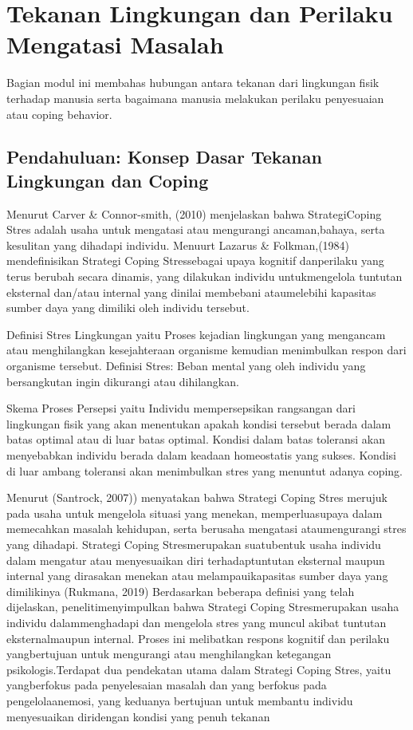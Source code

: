 \documentclass[../manperil.tex]{subfiles}
\begin{document}
\section{Tekanan Lingkungan dan Perilaku Mengatasi Masalah}

Bagian modul ini membahas hubungan antara tekanan dari lingkungan fisik terhadap manusia serta bagaimana manusia melakukan perilaku penyesuaian atau coping behavior.

\subsection{Pendahuluan: Konsep Dasar Tekanan Lingkungan dan Coping}


Menurut Carver \& Connor-smith, (2010) menjelaskan bahwa StrategiCoping Stres adalah usaha untuk mengatasi atau mengurangi ancaman,bahaya, serta kesulitan yang dihadapi individu. Menuurt Lazarus \& Folkman,(1984) mendefinisikan Strategi Coping Stressebagai upaya kognitif danperilaku yang terus berubah secara dinamis, yang dilakukan individu untukmengelola tuntutan eksternal dan/atau internal yang dinilai membebani ataumelebihi kapasitas sumber daya yang dimiliki oleh individu tersebut.


Definisi Stres Lingkungan yaitu Proses kejadian lingkungan yang mengancam atau menghilangkan kesejahteraan organisme kemudian menimbulkan respon dari organisme tersebut. Definisi Stres: Beban mental yang oleh individu yang bersangkutan ingin dikurangi atau dihilangkan.

Skema Proses Persepsi yaitu Individu mempersepsikan rangsangan dari lingkungan fisik yang akan menentukan apakah kondisi tersebut berada dalam batas optimal atau di luar batas optimal. Kondisi dalam batas toleransi akan menyebabkan individu berada dalam keadaan homeostatis yang sukses. Kondisi di luar ambang toleransi akan menimbulkan stres yang menuntut adanya coping.

Menurut (Santrock, 2007)) menyatakan bahwa Strategi Coping Stres merujuk pada usaha untuk mengelola situasi yang menekan, memperluasupaya dalam memecahkan masalah kehidupan, serta berusaha mengatasi ataumengurangi stres yang dihadapi. Strategi Coping Stresmerupakan suatubentuk usaha individu dalam mengatur atau menyesuaikan diri terhadaptuntutan eksternal maupun internal yang dirasakan menekan atau melampauikapasitas sumber daya yang dimilikinya (Rukmana, 2019) Berdasarkan beberapa definisi yang telah dijelaskan, penelitimenyimpulkan bahwa Strategi Coping Stresmerupakan usaha individu dalammenghadapi dan mengelola stres yang muncul akibat tuntutan eksternalmaupun internal. Proses ini melibatkan respons kognitif dan perilaku yangbertujuan untuk mengurangi atau menghilangkan ketegangan psikologis.Terdapat dua pendekatan utama dalam Strategi Coping Stres, yaitu yangberfokus pada penyelesaian masalah dan yang berfokus pada pengelolaanemosi, yang keduanya bertujuan untuk membantu individu menyesuaikan diridengan kondisi yang penuh tekanan
\end{document}
